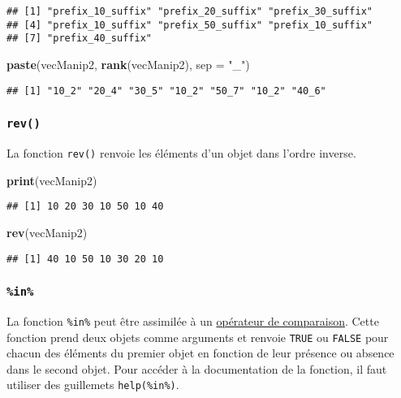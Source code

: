 \documentclass[]{book}
\newenvironment{Shaded}{\begin{snugshade}}{\end{snugshade}}
\newcommand{\KeywordTok}[1]{\textcolor[rgb]{0.13,0.29,0.53}{\textbf{#1}}}
\newcommand{\DataTypeTok}[1]{\textcolor[rgb]{0.13,0.29,0.53}{#1}}
\newcommand{\StringTok}[1]{\textcolor[rgb]{0.31,0.60,0.02}{#1}}
\newcommand{\NormalTok}[1]{#1}
\theoremstyle{definition}
\theoremstyle{definition}
\theoremstyle{definition}
\theoremstyle{remark}
\begin{document}
\begin{verbatim}
## [1] "prefix_10_suffix" "prefix_20_suffix" "prefix_30_suffix"
## [4] "prefix_10_suffix" "prefix_50_suffix" "prefix_10_suffix"
## [7] "prefix_40_suffix"
\end{verbatim}

\begin{Shaded}
\begin{Highlighting}[]
\KeywordTok{paste}\NormalTok{(vecManip2, }\KeywordTok{rank}\NormalTok{(vecManip2), }\DataTypeTok{sep =} \StringTok{"_"}\NormalTok{)}
\end{Highlighting}
\end{Shaded}

\begin{verbatim}
## [1] "10_2" "20_4" "30_5" "10_2" "50_7" "10_2" "40_6"
\end{verbatim}

\subsubsection{\texorpdfstring{\texttt{rev()}}{rev()}}\label{l015rev}

La fonction \texttt{rev()} renvoie les éléments d'un objet dans l'ordre
inverse.

\begin{Shaded}
\begin{Highlighting}[]
\KeywordTok{print}\NormalTok{(vecManip2)}
\end{Highlighting}
\end{Shaded}

\begin{verbatim}
## [1] 10 20 30 10 50 10 40
\end{verbatim}

\begin{Shaded}
\begin{Highlighting}[]
\KeywordTok{rev}\NormalTok{(vecManip2)}
\end{Highlighting}
\end{Shaded}

\begin{verbatim}
## [1] 40 10 50 10 30 20 10
\end{verbatim}

\hypertarget{l015in}{\subsubsection{\texorpdfstring{\texttt{\%in\%}}{\%in\%}}\label{l015in}}

La fonction \texttt{\%in\%} peut être assimilée à un
\protect\hyperlink{l011opcomp}{opérateur de comparaison}. Cette fonction
prend deux objets comme arguments et renvoie \texttt{TRUE} ou
\texttt{FALSE} pour chacun des éléments du premier objet en fonction de
leur présence ou absence dans le second objet. Pour accéder à la
documentation de la fonction, il faut utiliser des guillemets
\texttt{help(\textquotesingle{}\%in\%\textquotesingle{})}.
\end{document}
